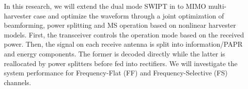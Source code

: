 In this research, we will extend the dual mode SWIPT in \cite{Park2018} to MIMO multi-harvester case and optimize the waveform through a joint optimization of beamforming, power splitting and MS operation based on nonlinear harvester models. First, the transceiver controls the operation mode based on the received power. Then, the signal on each receive antenna is split into information/PAPR and energy components. The former is decoded directly while the latter is reallocated by power splitters before fed into rectifiers. We will investigate the system performance for Frequency-Flat (FF) and Frequency-Selective (FS) channels. 